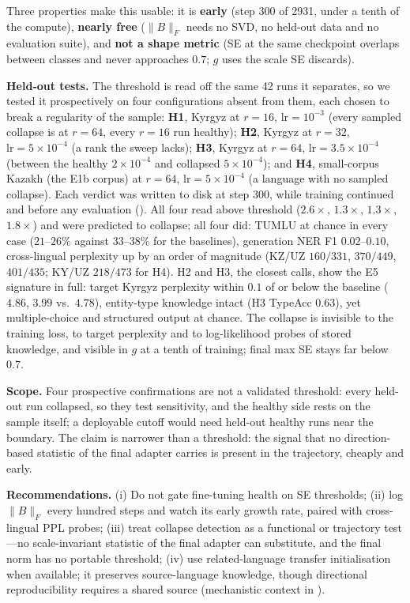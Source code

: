 \documentclass[11pt]{article}
\begin{document}
Three properties make this usable: it is \textbf{early} (step 300 of 2931, under a tenth of the compute), \textbf{nearly free} ($\|B\|_F$ needs no SVD, no held-out data and no evaluation suite), and \textbf{not a shape metric} (SE at the same checkpoint overlaps between classes and never approaches $0.7$; $g$ uses the scale SE discards).

\textbf{Held-out tests.} The threshold is read off the same 42 runs it separates, so we tested it prospectively on four configurations absent from them, each chosen to break a regularity of the sample: \textbf{H1}, Kyrgyz at $r{=}16$, $\text{lr}{=}10^{-3}$ (every sampled collapse is at $r{=}64$, every $r{=}16$ run healthy); \textbf{H2}, Kyrgyz at $r{=}32$, $\text{lr}{=}5{\times}10^{-4}$ (a rank the sweep lacks); \textbf{H3}, Kyrgyz at $r{=}64$, $\text{lr}{=}3.5{\times}10^{-4}$ (between the healthy $2{\times}10^{-4}$ and collapsed $5{\times}10^{-4}$); and \textbf{H4}, small-corpus Kazakh (the E1b corpus) at $r{=}64$, $\text{lr}{=}5{\times}10^{-4}$ (a language with no sampled collapse). Each verdict was written to disk at step 300, while training continued and before any evaluation (). All four read above threshold ($2.6\times$, $1.3\times$, $1.3\times$, $1.8\times$) and were predicted to collapse; all four did: TUMLU at chance in every case ($21$--$26\%$ against $33$--$38\%$ for the baselines), generation NER F1 $0.02$--$0.10$, cross-lingual perplexity up by an order of magnitude (KZ/UZ $160/331$, $370/449$, $401/435$; KY/UZ $218/473$ for H4). H2 and H3, the closest calls, show the E5 signature in full: target Kyrgyz perplexity within $0.1$ of or below the baseline ($4.86$, $3.99$ vs.\ $4.78$), entity-type knowledge intact (H3 TypeAcc $0.63$), yet multiple-choice and structured output at chance. The collapse is invisible to the training loss, to target perplexity and to log-likelihood probes of stored knowledge, and visible in $g$ at a tenth of training; final max SE stays far below $0.7$.

\textbf{Scope.} Four prospective confirmations are not a validated threshold: every held-out run collapsed, so they test sensitivity, and the healthy side rests on the sample itself; a deployable cutoff would need held-out healthy runs near the boundary. The claim is narrower than a threshold: the signal that no direction-based statistic of the final adapter carries is present in the trajectory, cheaply and early.

\textbf{Recommendations.} (i) Do not gate fine-tuning health on SE thresholds; (ii) log $\|B\|_F$ every hundred steps and watch its early growth rate, paired with cross-lingual PPL probes; (iii) treat collapse detection as a functional or trajectory test---no scale-invariant statistic of the final adapter can substitute, and the final norm has no portable threshold; (iv) use related-language transfer initialisation when available; it preserves source-language knowledge, though directional reproducibility requires a shared source (mechanistic context in ).
\end{document}
